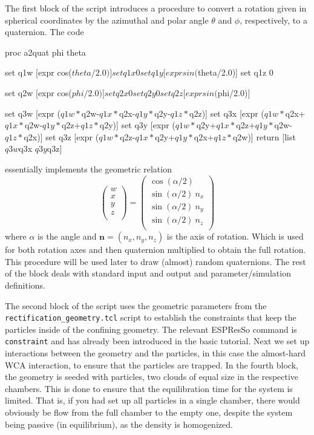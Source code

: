 \documentclass[aip,jcp,reprint,a4paper,onecolumn,amsmath]{revtex4-1}
\newcommand\code{\lstinline}
\newcommand{\es}{\mbox{\textsf{ESPResSo}}\xspace}
\newcommand\codees{\lstinline[language=espresso]}
\begin{document}
The first block of the script introduces a procedure to convert a rotation given in spherical coordinates by the azimuthal and polar angle $\theta$ and $\phi$, respectively, to a quaternion. The code 
\begin{espresso}
proc a2quat {phi theta} {
  set q1w   [expr cos($theta/2.0)]
  set q1x   0
  set q1y   [expr sin($theta/2.0)]
  set q1z   0

  set q2w   [expr cos($phi/2.0)]
  set q2x   0
  set q2y   0
  set q2z   [expr sin($phi/2.0)]

  set q3w   [expr ($q1w*$q2w-$q1x*$q2x-$q1y*$q2y-$q1z*$q2z)]
  set q3x   [expr ($q1w*$q2x+$q1x*$q2w-$q1y*$q2z+$q1z*$q2y)]
  set q3y   [expr ($q1w*$q2y+$q1x*$q2z+$q1y*$q2w-$q1z*$q2x)]
  set q3z   [expr ($q1w*$q2z-$q1x*$q2y+$q1y*$q2x+$q1z*$q2w)]
  return    [list $q3w $q3x $q3y $q3z]
}
\end{espresso}
essentially implements the geometric relation
\begin{equation}
  \begin{pmatrix}
    w \\ x \\ y \\ z \\
  \end{pmatrix}
  =
  \begin{pmatrix}
    \cos(\alpha/2) \\
    \sin(\alpha/2)\ n_x \\
    \sin(\alpha/2)\ n_y \\
    \sin(\alpha/2)\ n_z \\
  \end{pmatrix}
\end{equation}
where $\alpha$ is the angle and $\mathbf{n} = (n_x,n_y,n_z)$ is the
axis of rotation. Which is used for both rotation axes and then quaternion multiplied to obtain the full rotation. This procedure will be used later to draw (almost) random quaternions. The rest of the block deals with standard input and output and parameter/simulation definitions.

The second block of the script uses the geometric parameters from the \code{rectification_geometry.tcl} script to establish the constraints that keep the particles inside of the confining geometry. The relevant \es{} command is \codees{constraint} and has already been introduced in the basic tutorial. Next we set up interactions between the geometry and the particles, in this case the almost-hard WCA interaction, to ensure that the particles are trapped. In the fourth block, the geometry is seeded with particles, two clouds of equal size in the respective chambers. This is done to ensure that the equilibration time for the system is limited. That is, if you had set up all particles in a single chamber, there would obviously be flow from the full chamber to the empty one, despite the system being passive (in equilibrium), as the density is homogenized. 
\end{document}
